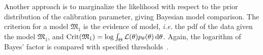 \documentclass[../../Main_ManuscritThese.tex]{subfiles}
\begin{document}
Another approach is to marginalize the likelihood with respect to the prior distribution of the calibration parameter, giving Bayesian model comparison. The criterion for a model $\mathfrak{M}_1$ is the evidence of model, \emph{i.e.} the pdf of the data given the model $\mathfrak{M}_1$, and $\mathrm{Crit}(\mathfrak{M}_1) = \log \int_\Theta \mathcal{L}(\theta) p_\theta(\theta)\,\mathrm{d}\theta$.
Again, the logarithm of Bayes' factor is compared with specified thresholds~\citep{kass_bayes_1995,burnham_multimodel_2004}.
\end{document}
